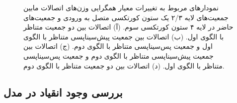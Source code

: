 \documentclass[12pt]{report}
\begin{document}
	\begin{figure}[]
		\centering
		\caption{
			نمودار‌های مربوط به تغییرات معیار همگرایی وزن‌های اتصالات مابین جمعیت‌های لایه ۲/۳ یک ستون کورتکسی متصل به ورودی و جمعیت‌های حاضر در لایه ۴ ستون کورتکسی سوم.
			(آ) اتصالات بین دو جمعیت متناظر با الگوی اول.
			(ب) اتصالات بین جمعیت پیش‌سیناپسی متناظر با الگوی اول و جمعیت پس‌سیناپسی متناظر با الگوی دوم.
			(ج) اتصالات بین جمعیت پیش‌سیناپسی متناظر با الگوی دوم و جمعیت پس‌سیناپسی متناظر با الگوی اول. 
			(د) اتصالات بین دو جمعیت متناظر با الگوی دوم.
		}
		\label{fig:convergence}
	\end{figure}
	
	\subsection{بررسی وجود انقیاد در مدل}
	
\end{document}
